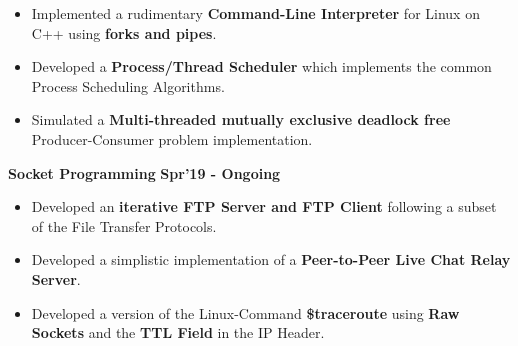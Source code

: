 \documentclass[10pt]{article}
\begin{document}
\begin{itemize}
    \item Implemented a rudimentary \textbf{Command-Line Interpreter} for Linux on C++ using \textbf{forks and pipes}. \\[-1.9em]
    \item Developed a \textbf{Process/Thread Scheduler} which implements the common Process Scheduling Algorithms.\\[-1.9em]
    \item Simulated a \textbf{Multi-threaded mutually exclusive deadlock free} Producer-Consumer problem implementation.\\[-1em]
\end{itemize}
\vspace{-0.5ex}    
\large {\textbf{Socket Programming}} \normalsize \href{https://github.com/shmundhra/Socket-Programming}{\faGithub} {\hfill}\textbf{Spr'19 - Ongoing}\\[-1.7em]
\begin{itemize}
    \item Developed an \textbf{iterative FTP Server and FTP Client} following a subset of the File Transfer Protocols.\\[-1.9em] 
    \item Developed a simplistic implementation of a \textbf{Peer-to-Peer Live Chat Relay Server}.\\[-1.9em]
    \item Developed a version of the Linux-Command \textbf{\$traceroute} using \textbf{Raw Sockets} and the \textbf{TTL Field} in the IP Header.
\end{itemize}
\end{document}
